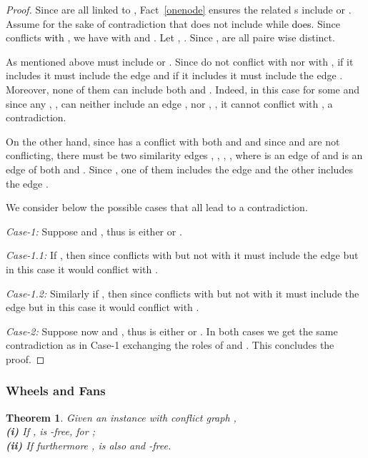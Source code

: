\documentclass[final]{dmtcs-episciences}
\newtheorem{theorem}{Theorem}
\newcommand\mar[1]{\textcolor{black}{#1}}
\begin{document}
\begin{proof}
Since  are all linked to , Fact~\ref{onenode} ensures the related s include   or . 
Assume for the sake of contradiction that  does not include  while   \mar{does}. Since  conflicts \mar{with} , we have   with  and . Let  , . Since ,  are all paire wise distinct.

As mentioned above  must include  or . Since  do not conflict with  nor with , if it includes  it must include the edge 
and if it includes  it must include the edge . Moreover, none of them can include both  and . Indeed, in this case  
 for some  and since any ,  , can neither include an edge ,  nor , , it cannot conflict with , a contradiction.

On the other hand, since  has a conflict with both  and  and since   and  are not conflicting, there must be two similarity edges , , , , where  is an edge of  and  is an edge of both  and . Since , one of them includes the edge  and the other includes the edge .

We consider below the possible cases that all lead to a contradiction.

 \emph{Case-1:}
Suppose  and , thus   
 is either  or . 

  \emph{Case-1.1:} If , then since  conflicts with  but not with  it must include the edge  but in this case it would conflict with .
 
  \emph{Case-1.2:} Similarly if , then since  conflicts with  but not with  it must include the edge  but in this case it would conflict with .

  \emph{Case-2:}
Suppose now   and , thus   
 is either  or .
In both cases we get the same contradiction as in Case-1 exchanging the roles of  and . This concludes the proof.
\end{proof}

\subsubsection{Wheels and Fans}\label{subsub:wf}

\begin{theorem}
\label{lemW8} 
Given an instance  with conflict graph ,\\
\textbf{ (i)}
If ,  is -free, for ;\\
\textbf{ (ii)} If furthermore ,  is also  and -free. 
\end{theorem}
\end{document}
